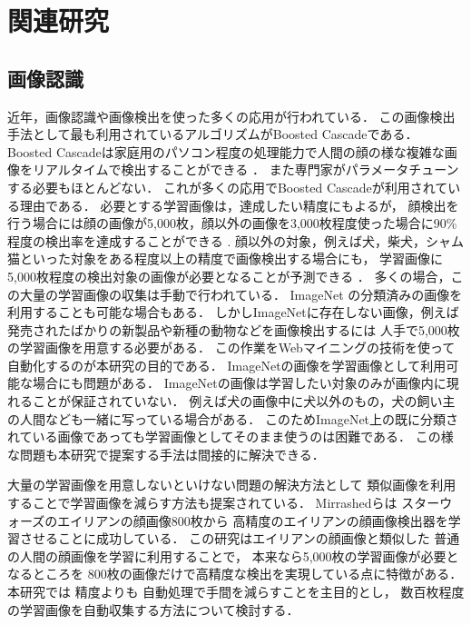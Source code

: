 \documentclass{deimj}
\begin{document}
\section{関連研究}
\label{sec:related}

\subsection{画像認識}
\label{sec:rel-image}

近年，画像認識や画像検出を使った多くの応用が行われている．
この画像検出手法として最も利用されているアルゴリズムがBoosted Cascade\cite{Viola01rapidobject}である．
Boosted Cascadeは家庭用のパソコン程度の処理能力で人間の顔の様な複雑な画像をリアルタイムで検出することができる
\cite{Bradsky08a}．
また専門家がパラメータチューンする必要もほとんどない．
これが多くの応用でBoosted Cascadeが利用されている理由である．
必要とする学習画像は，達成したい精度にもよるが，
顔検出を行う場合には顔の画像が5,000枚，顔以外の画像を3,000枚程度使った場合に90\%程度の検出率を達成することができる
\cite{Lienhart03empiricalanalysis}
.
顔以外の対象，例えば犬，柴犬，シャム猫といった対象をある程度以上の精度で画像検出する場合にも，
学習画像に5,000枚程度の検出対象の画像が必要となることが予測できる
\cite{conf/eccv/ZhangST08}
．
多くの場合，この大量の学習画像の収集は手動で行われている．
ImageNet\cite{imagenet}
の分類済みの画像を利用することも可能な場合もある．
しかしImageNetに存在しない画像，例えば発売されたばかりの新製品や新種の動物などを画像検出するには
人手で5,000枚の学習画像を用意する必要がある．
この作業をWebマイニングの技術を使って自動化するのが本研究の目的である．
ImageNetの画像を学習画像として利用可能な場合にも問題がある．
ImageNetの画像は学習したい対象のみが画像内に現れることが保証されていない．
例えば犬の画像中に犬以外のもの，犬の飼い主の人間なども一緒に写っている場合がある．
このためImageNet上の既に分類されている画像であっても学習画像としてそのまま使うのは困難である．
この様な問題も本研究で提案する手法は間接的に解決できる．

大量の学習画像を用意しないといけない問題の解決方法として
類似画像を利用することで学習画像を減らす方法も提案されている．
Mirrashed\cite{Mirrashed_2013_ICCV}らは
スターウォーズのエイリアンの顔画像800枚から
高精度のエイリアンの顔画像検出器を学習させることに成功している．
この研究はエイリアンの顔画像と類似した
普通の人間の顔画像を学習に利用することで，
本来なら5,000枚の学習画像が必要となるところを
800枚の画像だけで高精度な検出を実現している点に特徴がある．
本研究では
精度よりも
自動処理で手間を減らすことを主目的とし，
数百枚程度の学習画像を自動収集する方法について検討する．
\end{document}
